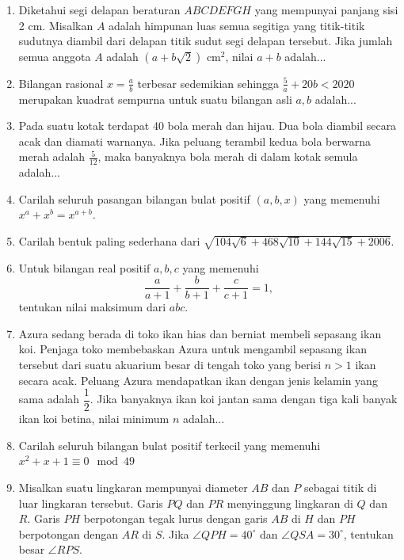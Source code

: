 \documentclass[11pt]{scrartcl}
\begin{document}
\begin{enumerate}[resume]
		\item Diketahui segi delapan beraturan $ABCDEFGH$ yang mempunyai panjang sisi 2 cm. Misalkan $A$ adalah himpunan luas semua segitiga yang titik-titik sudutnya diambil dari delapan titik sudut segi delapan tersebut. Jika jumlah semua anggota $A$ adalah $(a+b\sqrt{2})$ cm$^2$, nilai $a+b$ adalah...
		
		\item Bilangan rasional $x=\frac{a}{b}$ terbesar sedemikian sehingga $\frac{5}{a}+20b < 2020$ merupakan kuadrat sempurna untuk suatu bilangan asli $a,b$ adalah...
		
		\item Pada suatu kotak terdapat 40 bola merah dan hijau. Dua bola diambil secara acak dan diamati warnanya. Jika peluang terambil kedua bola berwarna merah adalah $\frac{5}{12}$, maka banyaknya bola merah di dalam kotak semula adalah...
		
		\item Carilah seluruh pasangan bilangan bulat positif $(a,b,x)$ yang memenuhi $x^a+x^b=x^{a+b}$. 
		
		\item Carilah bentuk paling sederhana dari $\sqrt{104\sqrt{6}+468\sqrt{10}+144\sqrt{15}+2006}$.
		
		\item Untuk bilangan real positif $a,b,c$ yang memenuhi $$\frac{a}{a+1}+\frac{b}{b+1}+\frac{c}{c+1} = 1,$$ tentukan nilai maksimum dari $abc$.
		
		\item Azura sedang berada di toko ikan hias dan berniat membeli sepasang ikan koi. Penjaga toko membebaskan Azura untuk mengambil sepasang ikan tersebut dari suatu akuarium besar di tengah toko yang berisi $n>1$ ikan secara acak. Peluang Azura mendapatkan ikan dengan jenis kelamin yang sama adalah $\dfrac12$. Jika banyaknya ikan koi jantan sama dengan tiga kali banyak ikan koi betina, nilai minimum $n$ adalah...
		
		\item Carilah seluruh bilangan bulat positif terkecil yang memenuhi $x^2+x+1 \equiv 0 \mod 49$
		
		\item Misalkan suatu lingkaran mempunyai diameter $AB$ dan $P$ sebagai titik di luar lingkaran tersebut. Garis $PQ$ dan $PR$ menyinggung lingkaran di $Q$ dan $R$. Garis $PH$ berpotongan tegak lurus dengan garis $AB$ di $H$ dan $PH$ berpotongan dengan $AR$ di $S$. Jika $\angle QPH = 40^\circ$ dan $\angle QSA = 30^\circ$, tentukan besar $\angle RPS$.
		

\end{enumerate}
\end{document}
